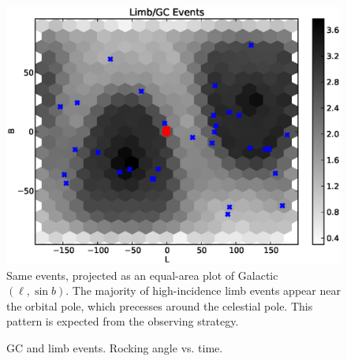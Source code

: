 \documentclass[aps,twocolumn,prd,superscriptaddress,showpacs,nofootinbib,fixfloat]{revtex4}
\begin{document}
% 
\begin{figure}
  \centering
  \includegraphics[width=1.0\linewidth]{plots/limb_l_b.eps}
  \caption{Same events, projected as an equal-area plot of
  Galactic $(\ell, \sin b)$.  The majority of high-incidence
  limb events appear near the orbital pole, which precesses
  around the celestial pole.  This pattern is expected from
  the observing strategy.}
  \label{fig:l-b}
\end{figure}

\begin{figure}
  \begin{center}
  \end{center}
  \caption{GC and limb events. Rocking angle vs. time.}
  \label{fig:rockTime}
\end{figure}
\end{document}
